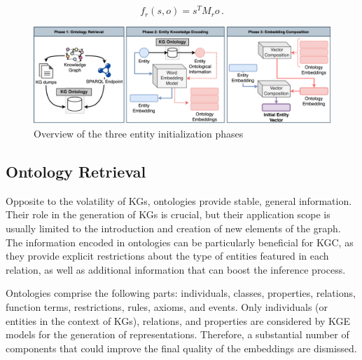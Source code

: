 \begin{equation}\label{eq:bilinear_score}
    f_r(s,o)=s^T M_r o \,.
\end{equation}



\begin{figure}
    \centering
    \includegraphics[width=\linewidth]{4_kbsintegrationdl/figures/Initialization_phases.eps}
    \caption{Overview of the three entity initialization phases}
    \label{fig:overview_initialization}
\end{figure}


\subsection{Ontology Retrieval} \label{subsec:s4_onto_retrieval}
Opposite to the volatility of KGs, ontologies provide stable, general information. Their role in the generation of KGs is crucial, but their application scope is usually limited to the introduction and creation of new elements of the graph. The information encoded in ontologies can be particularly beneficial for KGC, as they provide explicit restrictions about the type of entities featured in each relation, as well as additional information that can boost the inference process.

Ontologies comprise the following parts: individuals, classes, properties, relations, function terms, restrictions, rules, axioms, and events. Only individuals (or entities in the context of KGs), relations, and properties are considered by KGE models for the generation of representations. Therefore, a substantial number of components that could improve the final quality of the embeddings are dismissed.

